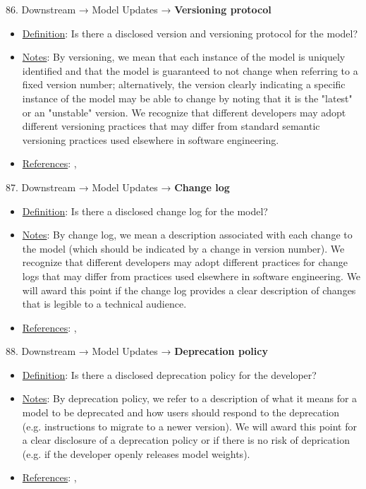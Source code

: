 86. Downstream → Model Updates → \textbf{Versioning protocol}
\vspace{-\parskip}
\begin{itemize}
\item
\underline{Definition}: Is there a disclosed version and versioning protocol for the model?
\item
\underline{Notes}: By versioning, we mean that each instance of the model is uniquely identified and that the model is guaranteed to not change when referring to a fixed version number; alternatively, the version clearly indicating a specific instance of the model may be able to change by noting that it is the "latest" or an "unstable" version. We recognize that different developers may adopt different versioning practices that may differ from standard semantic versioning practices used elsewhere in software engineering.
\item
\underline{References}: \citet{chen2023chatgpts}, \citet{Lam2020}
\end{itemize}


87. Downstream → Model Updates → \textbf{Change log}
\vspace{-\parskip}
\begin{itemize}
\item
\underline{Definition}: Is there a disclosed change log for the model?
\item
\underline{Notes}: By change log, we mean a description associated with each change to the model (which should be indicated by a change in version number). We recognize that different developers may adopt different practices for change logs that may differ from practices used elsewhere in software engineering. We will award this point if the change log provides a clear description of changes that is legible to a technical audience.
\item
\underline{References}: \citet{chen2023chatgpts}, \citet{li2016watch}
\end{itemize}


88. Downstream → Model Updates → \textbf{Deprecation policy}
\vspace{-\parskip}
\begin{itemize}
\item
\underline{Definition}: Is there a disclosed deprecation policy for the developer?
\item
\underline{Notes}: By deprecation policy, we refer to a description of what it means for a model to be deprecated and how users should respond to the deprecation (e.g. instructions to migrate to a newer version). We will award this point for a clear disclosure of a deprecation policy or if there is no risk of deprication (e.g. if the developer openly releases model weights).
\item
\underline{References}: \citet{chen2023chatgpts}, \citet{haryono2020automatic}
\end{itemize}


